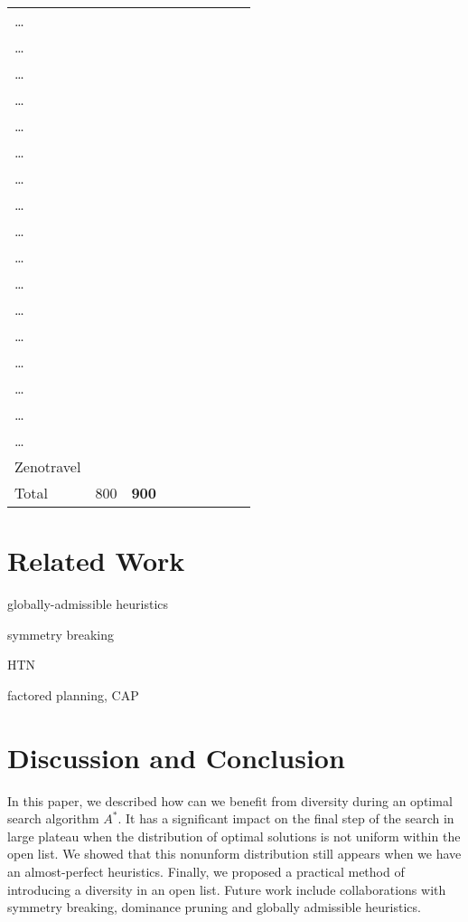{\begin{table}[htb]
\begin{tabular}{l|ll|ll|ll|ll|}
\ldots{} &  &  &  &  &  &  &  & \\
\ldots{} &  &  &  &  &  &  &  & \\
\ldots{} &  &  &  &  &  &  &  & \\
\ldots{} &  &  &  &  &  &  &  & \\
\ldots{} &  &  &  &  &  &  &  & \\
\ldots{} &  &  &  &  &  &  &  & \\
\ldots{} &  &  &  &  &  &  &  & \\
\ldots{} &  &  &  &  &  &  &  & \\
\ldots{} &  &  &  &  &  &  &  & \\
\ldots{} &  &  &  &  &  &  &  & \\
\ldots{} &  &  &  &  &  &  &  & \\
\ldots{} &  &  &  &  &  &  &  & \\
\ldots{} &  &  &  &  &  &  &  & \\
\ldots{} &  &  &  &  &  &  &  & \\
\ldots{} &  &  &  &  &  &  &  & \\
\ldots{} &  &  &  &  &  &  &  & \\
\ldots{} &  &  &  &  &  &  &  & \\
Zenotravel &  &  &  &  &  &  &  & \\
\hline
Total & 800 & \textbf{900} &  &  &  &  &  & \\
\end{tabular}
\end{table}

}
\section{Related Work}
\label{sec-4}

globally-admissible heuristics

symmetry breaking

HTN

factored planning, CAP
\section{Discussion and Conclusion}

In this paper, we described how can we benefit from diversity during an optimal search algorithm $A^*$. It has a significant impact on the final step of the search in large plateau when the distribution of optimal solutions is not uniform within the open list. We showed that this nonunform distribution still appears when we have an almost-perfect heuristics. Finally, we proposed a practical method of introducing a diversity in an open list. Future work include collaborations with symmetry breaking, dominance pruning and globally admissible heuristics.
